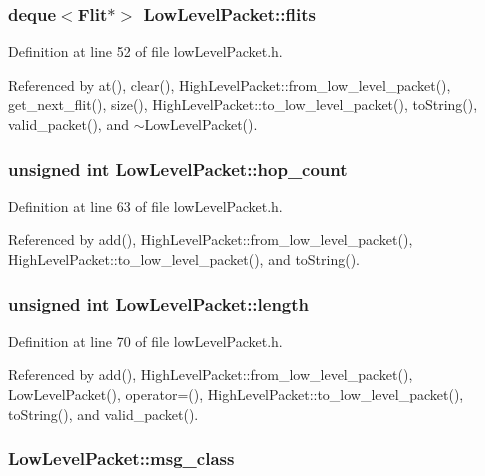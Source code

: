 \subsubsection[{flits}]{\setlength{\rightskip}{0pt plus 5cm}deque$<${\bf Flit}$\ast$$>$ {\bf LowLevelPacket::flits}}\label{classLowLevelPacket_eee86f15c92fad6be8b7e6bc4df223e3}




Definition at line 52 of file lowLevelPacket.h.

Referenced by at(), clear(), HighLevelPacket::from\_\-low\_\-level\_\-packet(), get\_\-next\_\-flit(), size(), HighLevelPacket::to\_\-low\_\-level\_\-packet(), toString(), valid\_\-packet(), and $\sim$LowLevelPacket().
\subsubsection[{hop\_\-count}]{\setlength{\rightskip}{0pt plus 5cm}unsigned int {\bf LowLevelPacket::hop\_\-count}}\label{classLowLevelPacket_33d231de5104e9f1a79c4b313e8ab5c6}




Definition at line 63 of file lowLevelPacket.h.

Referenced by add(), HighLevelPacket::from\_\-low\_\-level\_\-packet(), HighLevelPacket::to\_\-low\_\-level\_\-packet(), and toString().
\subsubsection[{length}]{\setlength{\rightskip}{0pt plus 5cm}unsigned int {\bf LowLevelPacket::length}}\label{classLowLevelPacket_69297a63b62cdce301d004782cc3ef3c}




Definition at line 70 of file lowLevelPacket.h.

Referenced by add(), HighLevelPacket::from\_\-low\_\-level\_\-packet(), LowLevelPacket(), operator=(), HighLevelPacket::to\_\-low\_\-level\_\-packet(), toString(), and valid\_\-packet().
\subsubsection[{msg\_\-class}]{ {\bf LowLevelPacket::msg\_\-class}}\label{classLowLevelPacket_f910145223e23da0d8d5fca5b231cd9a}





